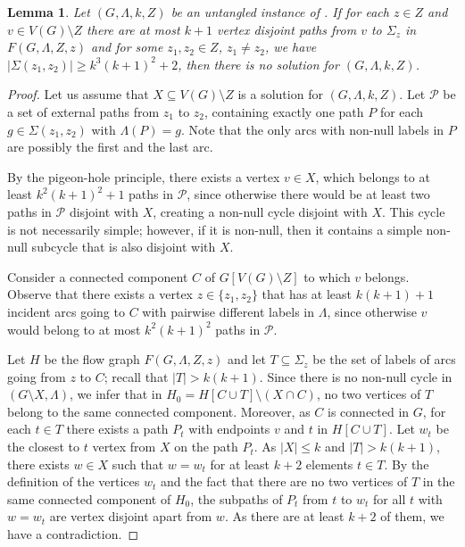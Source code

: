 \documentclass[11pt]{article}
\newtheorem{lemma}[theorem]{Lemma}
\theoremstyle{definition}
\newcommand{\cgfvsshort}{{\sc{C-GFVS}}\xspace}
\begin{document}
\begin{lemma}
\label{lem:many_paths}
Let $(G,\Lambda,k,Z)$ be an untangled instance of \cgfvsshort.
If for each $z \in Z$ and $v \in V(G) \setminus Z$
there are at most $k+1$ vertex disjoint paths from $v$
to $\Sigma_z$ in $F(G,\Lambda,Z,z)$
and for some $z_1,z_2 \in Z$, $z_1 \neq z_2$, we have $|\Sigma(z_1,z_2)| \ge k^3(k+1)^2+2$, 
then there is no solution for $(G,\Lambda,k,Z)$.
\end{lemma}

\begin{proof}
Let us assume that $X \subseteq V(G)\setminus Z$ is a solution for $(G,\Lambda,k,Z)$.
Let $\mathcal{P}$ be a set of external paths from $z_1$ to $z_2$,
containing exactly one path $P$ for each $g \in \Sigma(z_1,z_2)$ with $\Lambda(P)=g$.
Note that the only arcs with non-null labels in $P$ are possibly the first and the last arc.

By the pigeon-hole principle, there exists a vertex $v \in X$,
which belongs to at least $k^2(k+1)^2+1$ paths in $\mathcal{P}$,
since otherwise there would be at least two paths in $\mathcal{P}$
disjoint with $X$, creating a non-null cycle disjoint with $X$. This cycle is not necessarily simple; however, if it is non-null, then it contains a simple non-null subcycle that is also disjoint with $X$.

Consider a connected component $C$ of $G[V(G) \setminus Z]$ to which $v$ belongs.
Observe that there exists a vertex $z\in \{z_1,z_2\}$
that has at least $k(k+1)+1$ incident arcs
going to $C$ with pairwise different labels in $\Lambda$,
since otherwise $v$ would belong to at most $k^2(k+1)^2$ paths in $\mathcal{P}$.

Let $H$ be the flow graph $F(G,\Lambda,Z,z)$
and let $T \subseteq \Sigma_z$ be the set of labels of arcs going from $z$ to $C$; recall that $|T| > k(k+1)$.
Since there is no non-null cycle in $(G\setminus X,\Lambda)$, 
we infer that in $H_0 = H[C \cup T] \setminus (X\cap C)$, 
no two vertices of $T$ belong to the same connected component.
Moreover, as $C$ is connected in $G$, for each $t \in T$ there exists a path $P_t$ with endpoints $v$ and $t$ in $H[C \cup T]$.
Let $w_t$ be the closest to $t$ vertex from $X$ on the path $P_t$. As $|X| \leq k$ and $|T| > k(k+1)$,
there exists $w \in X$ such that $w = w_t$ for at least $k+2$ elements $t \in T$.
By the definition of the vertices $w_t$ and the fact that there are no two vertices of $T$ in the same connected component of $H_0$,
the subpaths of $P_t$ from $t$ to $w_t$ for all $t$ with $w=w_t$ are vertex disjoint apart from $w$.
As there are at least $k+2$ of them, we have a contradiction.
\end{proof}
\end{document}
